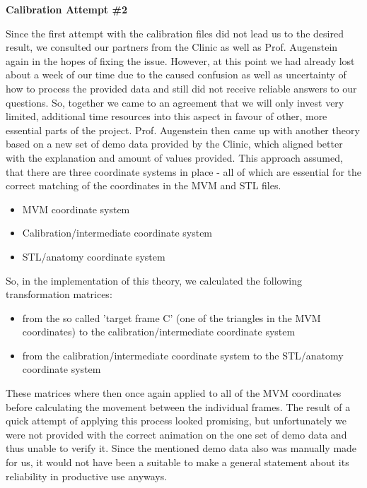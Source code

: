 \noindent \textbf{Calibration Attempt \#2} \newline

\noindent Since the first attempt with the calibration files did not lead us to the desired result, we consulted our partners from the Clinic as well as Prof. Augenstein again in the hopes of fixing the issue. However, at this point we had already lost about a week of our time due to the caused confusion as well as uncertainty of how to process the provided data and still did not receive reliable answers to our questions. So, together we came to an agreement that we will only invest very limited, additional time resources into this aspect in favour of other, more essential parts of the project.\newline
Prof. Augenstein then came up with another theory based on a new set of demo data provided by the Clinic, which aligned better with the explanation and amount of values provided. This approach assumed, that there are three coordinate systems in place - all of which are essential for the correct matching of the coordinates in the MVM and STL files.

\begin{itemize}
	\item MVM coordinate system
	\item Calibration/intermediate coordinate system
	\item STL/anatomy coordinate system
\end{itemize}

\noindent So, in the implementation of this theory, we calculated the following transformation matrices:
\begin{itemize}
	\item from the so called 'target frame C' (one of the triangles in the MVM coordinates) to the calibration/intermediate coordinate system
	\item from the calibration/intermediate coordinate system to the STL/anatomy coordinate system
\end{itemize}
 \noindent These matrices where then once again applied to all of the MVM coordinates before calculating the movement between the individual frames. The result of a quick attempt of applying this process looked promising, but unfortunately we were not provided with the correct animation on the one set of demo data and thus unable to verify it. Since the mentioned demo data also was manually made for us, it would not have been a suitable to make a general statement about its reliability in productive use anyways.


